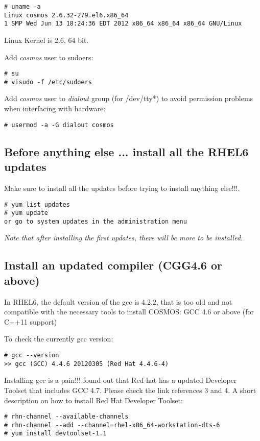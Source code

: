 \documentclass{article}
\begin{document}
\begin{lstlisting}[style=BashInputStyle]
# uname -a
Linux cosmos 2.6.32-279.el6.x86_64 
1 SMP Wed Jun 13 18:24:36 EDT 2012 x86_64 x86_64 x86_64 GNU/Linux
\end{lstlisting}

Linux Kernel is 2.6, 64 bit.

Add \textit{cosmos} user to sudoers:
\begin{lstlisting}[style=BashInputStyle]
# su
# visudo -f /etc/sudoers
\end{lstlisting}
				

Add \textit{cosmos} user to \textit{dialout} group (for /dev/tty*) to avoid permission problems when interfacing with hardware:
\begin{lstlisting}[style=BashInputStyle]
# usermod -a -G dialout cosmos
\end{lstlisting}


\subsection{Before anything else ... install all the RHEL6 updates}
Make sure to install all the updates before trying to install anything else!!!.  
\begin{lstlisting}[style=BashInputStyle]
# yum list updates
# yum update
or go to system updates in the administration menu
\end{lstlisting}
\textit{Note that after installing the first updates, there will be more to be installed.} \\









\subsection{Install an updated compiler (CGG4.6 or above)}
In RHEL6, the default version of the gcc is 4.2.2, that is too old and not compatible with the necessary tools to install COSMOS:  GCC 4.6 or above (for C++11 support)

To check the currently gcc version:
\begin{lstlisting}[style=BashInputStyle]
# gcc --version
>> gcc (GCC) 4.4.6 20120305 (Red Hat 4.4.6-4)
\end{lstlisting}

Installing gcc is a pain!!! found out that Red hat has a updated Developer Toolset that includes GCC 4.7. Please check the link references 3 and 4. A short description on how to install Red Hat Developer Toolset:
\begin{lstlisting}[style=BashInputStyle]
# rhn-channel --available-channels
# rhn-channel --add --channel=rhel-x86_64-workstation-dts-6
# yum install devtoolset-1.1
\end{lstlisting}
\end{document}
